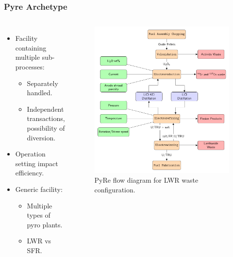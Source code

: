 \begin{frame}
	\frametitle{Pyre Archetype}
	\begin{columns}
		\column[t]{5cm}
		\begin{itemize}
			\item Facility containing multiple sub-processes:
			\begin{itemize}
				\item Separately handled.
				\item Independent transactions, possibility of diversion.
			\end{itemize}
			\item Operation setting impact efficiency.
			\item Generic facility:
			\begin{itemize}
				\item Multiple types of pyro plants.
				\item LWR vs SFR.
			\end{itemize}
		\end{itemize}
		\column[t]{6cm}
		\begin{figure}
			\includegraphics[width=\linewidth]{./images/westphal-pyre.pdf}
			\caption{PyRe flow diagram for LWR waste configuration.}
			\label{fig:pyre}
		\end{figure}
	\end{columns}
\end{frame}

